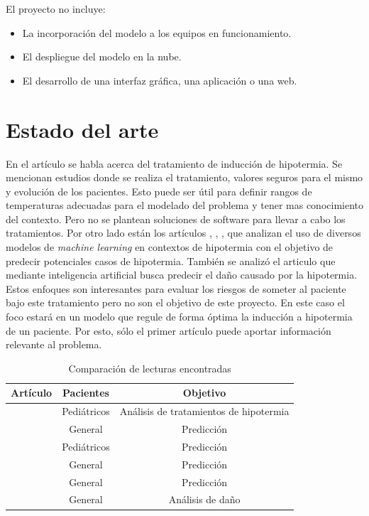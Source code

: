 El proyecto no incluye: 
\begin{itemize}
	\item La incorporación del modelo a los equipos en funcionamiento.
	\item El despliegue del modelo en la nube.
	\item El desarrollo de una interfaz gráfica, una aplicación o una web.
\end{itemize}

\section{Estado del arte}

En el artículo \citep{jcm12062095} se habla acerca del tratamiento de inducción de hipotermia. Se mencionan estudios donde se realiza el tratamiento, valores seguros para el mismo y evolución de los pacientes. Esto puede ser útil para definir rangos de temperaturas adecuadas para el modelado del problema y tener mas conocimiento del contexto. Pero no se plantean soluciones de software para llevar a cabo los tratamientos.
Por otro lado están los artículos \citep{jcm12134434},	\citep{10.3389/fphys.2022.921884}, \citep{10125880}, \citep{doi:10.1177/09544119241266375} que analizan el uso de diversos modelos de \textit{machine learning} en contextos de hipotermia con el objetivo de predecir potenciales casos de hipotermia. También se analizó el articulo \citep{SHAMMI2022107013} que mediante inteligencia artificial busca predecir el daño causado por la hipotermia. Estos enfoques son interesantes para evaluar los riesgos de someter al paciente bajo este tratamiento pero no son el objetivo de este proyecto. En este caso el foco estará en un modelo que regule de forma óptima la inducción a hipotermia de un paciente. Por esto, sólo el primer artículo puede aportar información relevante al problema.

\begin{table}[h]
	\centering
	\caption[Estado del arte]{Comparación de lecturas encontradas}
	\begin{tabular}{l c c}    
		\toprule
		\textbf{Artículo} 	 & \textbf{Pacientes} 		& \textbf{Objetivo}  \\
		\midrule
 			\citep{jcm12062095} & Pediátricos 				&  Análisis de tratamientos de hipotermia\\		
			\citep{jcm12134434}   & General				& Predicción \\
 			\citep{10.3389/fphys.2022.921884} & Pediátricos 				&  Predicción\\		
			\citep{10125880} & General				& Predicción \\
			\citep{doi:10.1177/09544119241266375} 	 & General				& Predicción \\
			\citep{SHAMMI2022107013} & General				& Análisis de daño \\
		\bottomrule
		\hline
	\end{tabular}
	\label{tab:estado_del_arte}
\end{table}

